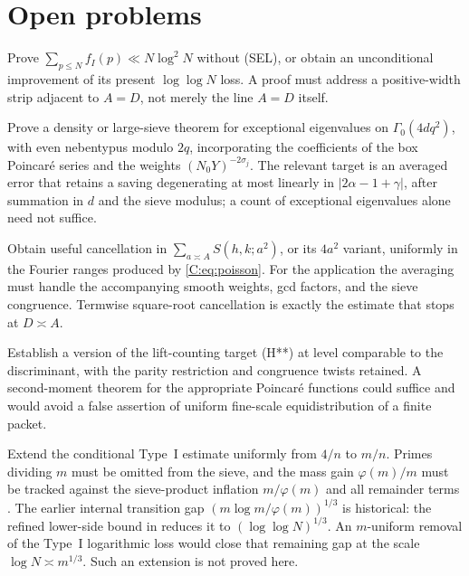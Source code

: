 \section{Open problems}\label{sec:open}
\begin{problem}
Prove $\sum_{p\leq N}f_I(p)\ll N\log^2N$ without (SEL), or obtain an
unconditional improvement of its present $\log\log N$ loss.  A proof
must address a positive-width strip adjacent to $A=D$, not merely
the line $A=D$ itself.
\end{problem}

\begin{problem}
Prove a density or large-sieve theorem for exceptional eigenvalues
on $\Gamma_0(4dq^2)$, with even nebentypus modulo $2q$, incorporating
the coefficients of the box Poincar\'e series and the weights
$(N_0Y)^{-2\sigma_j}$.  The relevant target is an averaged error that
retains a saving degenerating at most linearly in
$|2\alpha-1+\gamma|$, after summation in $d$ and the sieve modulus;
a count of exceptional eigenvalues alone need not suffice.
\end{problem}

\begin{problem}
Obtain useful cancellation in $\sum_{a\asymp A}S(h,k;a^2)$, or its
$4a^2$ variant, uniformly in the Fourier ranges produced by
\eqref{C:eq:poisson}.  For the application the averaging must handle
the accompanying smooth weights, gcd factors, and the sieve
congruence.  Termwise square-root cancellation is exactly the
estimate that stops at $D\asymp A$.
\end{problem}

\begin{problem}
Establish a version of the lift-counting target (H**) at level
comparable to the discriminant, with the parity restriction and
congruence twists retained.  A second-moment theorem for the
appropriate Poincar\'e functions could suffice and would avoid a
false assertion of uniform fine-scale equidistribution of a finite
packet.
\end{problem}

\begin{problem}
Extend the conditional Type~I estimate uniformly from $4/n$ to
$m/n$.  Primes dividing $m$ must be omitted from the sieve, and the
mass gain $\varphi(m)/m$ must be tracked against the sieve-product
inflation $m/\varphi(m)$ and all remainder terms
\cite[remarks after Theorem~3.8]{MN3}.  The earlier internal transition
gap $(m\log m/\varphi(m))^{1/3}$ is historical: the refined lower-side
bound in \cite[\S2, Theorem~L$'$]{MN3} reduces it to
$(\log\log N)^{1/3}$.  An $m$-uniform removal of the Type~I logarithmic
loss would close that remaining gap at the scale
$\log N\asymp m^{1/3}$.  Such an extension is not proved here.
\end{problem}

